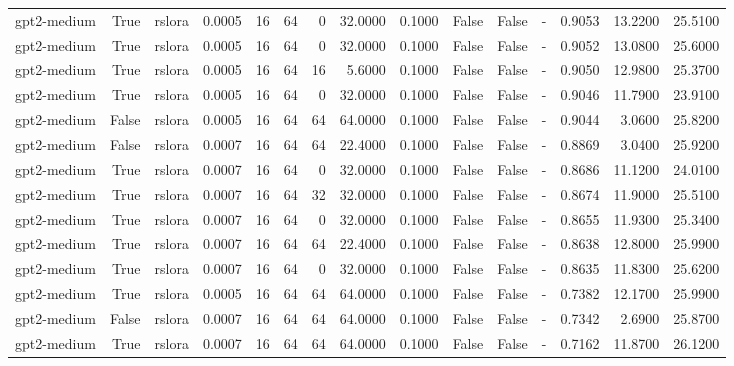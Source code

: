 \begin{tabular}{lrlrrrrrrlllrrr}
gpt2-medium & True & rslora & 0.0005 & 16 & 64 & 0 & 32.0000 & 0.1000 & False & False & - & 0.9053 & 13.2200 & 25.5100 \\
gpt2-medium & True & rslora & 0.0005 & 16 & 64 & 0 & 32.0000 & 0.1000 & False & False & - & 0.9052 & 13.0800 & 25.6000 \\
gpt2-medium & True & rslora & 0.0005 & 16 & 64 & 16 & 5.6000 & 0.1000 & False & False & - & 0.9050 & 12.9800 & 25.3700 \\
gpt2-medium & True & rslora & 0.0005 & 16 & 64 & 0 & 32.0000 & 0.1000 & False & False & - & 0.9046 & 11.7900 & 23.9100 \\
gpt2-medium & False & rslora & 0.0005 & 16 & 64 & 64 & 64.0000 & 0.1000 & False & False & - & 0.9044 & 3.0600 & 25.8200 \\
gpt2-medium & False & rslora & 0.0007 & 16 & 64 & 64 & 22.4000 & 0.1000 & False & False & - & 0.8869 & 3.0400 & 25.9200 \\
gpt2-medium & True & rslora & 0.0007 & 16 & 64 & 0 & 32.0000 & 0.1000 & False & False & - & 0.8686 & 11.1200 & 24.0100 \\
gpt2-medium & True & rslora & 0.0007 & 16 & 64 & 32 & 32.0000 & 0.1000 & False & False & - & 0.8674 & 11.9000 & 25.5100 \\
gpt2-medium & True & rslora & 0.0007 & 16 & 64 & 0 & 32.0000 & 0.1000 & False & False & - & 0.8655 & 11.9300 & 25.3400 \\
gpt2-medium & True & rslora & 0.0007 & 16 & 64 & 64 & 22.4000 & 0.1000 & False & False & - & 0.8638 & 12.8000 & 25.9900 \\
gpt2-medium & True & rslora & 0.0007 & 16 & 64 & 0 & 32.0000 & 0.1000 & False & False & - & 0.8635 & 11.8300 & 25.6200 \\
gpt2-medium & True & rslora & 0.0005 & 16 & 64 & 64 & 64.0000 & 0.1000 & False & False & - & 0.7382 & 12.1700 & 25.9900 \\
gpt2-medium & False & rslora & 0.0007 & 16 & 64 & 64 & 64.0000 & 0.1000 & False & False & - & 0.7342 & 2.6900 & 25.8700 \\
gpt2-medium & True & rslora & 0.0007 & 16 & 64 & 64 & 64.0000 & 0.1000 & False & False & - & 0.7162 & 11.8700 & 26.1200 \\
\bottomrule
\end{tabular}
